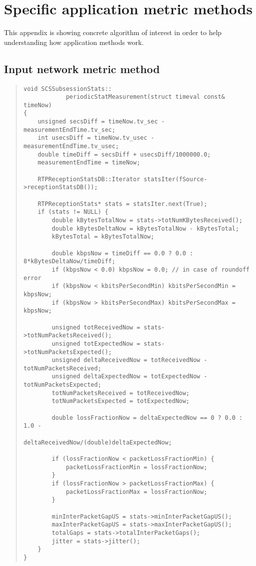 \chapter{Specific application metric methods}\label{ANX:appALG}

This appendix is showing concrete algorithm of interest in order to help understanding how application methods work.

\section{Input network metric method}\label{inmm}
\begin{quote}
\begin{verbatim}
void SCSSubsessionStats::
			periodicStatMeasurement(struct timeval const& timeNow) 
{
    unsigned secsDiff = timeNow.tv_sec - measurementEndTime.tv_sec;
    int usecsDiff = timeNow.tv_usec - measurementEndTime.tv_usec;
    double timeDiff = secsDiff + usecsDiff/1000000.0;
    measurementEndTime = timeNow;

    RTPReceptionStatsDB::Iterator statsIter(fSource->receptionStatsDB());

    RTPReceptionStats* stats = statsIter.next(True);
    if (stats != NULL) {
        double kBytesTotalNow = stats->totNumKBytesReceived();
        double kBytesDeltaNow = kBytesTotalNow - kBytesTotal;
        kBytesTotal = kBytesTotalNow;

        double kbpsNow = timeDiff == 0.0 ? 0.0 : 8*kBytesDeltaNow/timeDiff;
        if (kbpsNow < 0.0) kbpsNow = 0.0; // in case of roundoff error
        if (kbpsNow < kbitsPerSecondMin) kbitsPerSecondMin = kbpsNow;
        if (kbpsNow > kbitsPerSecondMax) kbitsPerSecondMax = kbpsNow;

        unsigned totReceivedNow = stats->totNumPacketsReceived();
        unsigned totExpectedNow = stats->totNumPacketsExpected();
        unsigned deltaReceivedNow = totReceivedNow - totNumPacketsReceived;
        unsigned deltaExpectedNow = totExpectedNow - totNumPacketsExpected;
        totNumPacketsReceived = totReceivedNow;
        totNumPacketsExpected = totExpectedNow;

        double lossFractionNow = deltaExpectedNow == 0 ? 0.0 : 1.0 -
        							 deltaReceivedNow/(double)deltaExpectedNow;

        if (lossFractionNow < packetLossFractionMin) {
            packetLossFractionMin = lossFractionNow;
        }
        if (lossFractionNow > packetLossFractionMax) {
            packetLossFractionMax = lossFractionNow;
        }

        minInterPacketGapUS = stats->minInterPacketGapUS();
        maxInterPacketGapUS = stats->maxInterPacketGapUS();
        totalGaps = stats->totalInterPacketGaps();
        jitter = stats->jitter();
    }
}
\end{verbatim}
\end{quote} 
